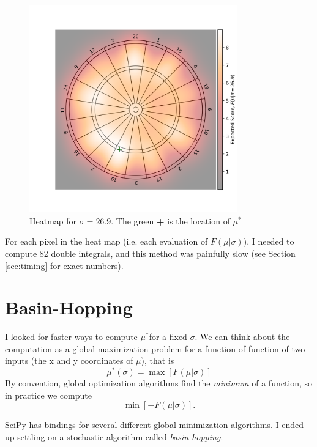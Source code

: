 \documentclass[]{article}
\newcommand{\mustar}{\ensuremath{\mu^* }}
\begin{document}
\begin{figure}[h]
	\centering
	\includegraphics[width=0.8\textwidth]{../images/gist_hear.png}
	\caption{Heatmap for $\sigma = 26.9$. The green \textbf{+} is the location of  \mustar}
	\label{fig:basicheatmap}
\end{figure}

For each pixel in the heat map (i.e. each evaluation of $F(\mu \vert \sigma)$), I needed to compute 82 double integrals, and this method was painfully slow (see Section \ref{sec:timing} for exact numbers).


\section{Basin-Hopping}

I looked for faster ways to compute  \mustar for a fixed $\sigma$. We can think about the computation as a global maximization problem for a function of function of two inputs (the x and y coordinates of $\mu$), that is
\begin{equation}
	\mu^*(\sigma) = \max [F(\mu \vert \sigma)]
\end{equation}
By convention, global optimization algorithms find the \textit{minimum} of a function, so in practice we compute 
\begin{equation}
	\min[-F(\mu \vert \sigma)].
\end{equation}

SciPy has bindings for several different global minimization algorithms. I ended up settling on a stochastic algorithm called \textit{basin-hopping}. 
\end{document}
